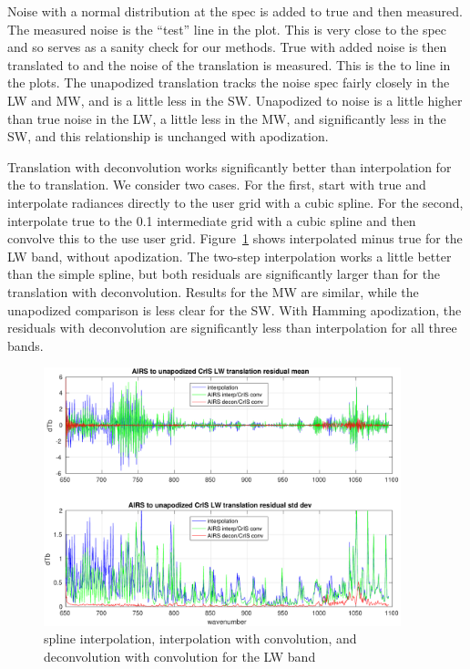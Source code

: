 \documentclass[11pt]{article}
\begin{document}
Noise with a normal distribution at the {\airs} spec is added to
true {\airs} and then measured.  The measured {\airs} noise is the
``test'' line in the plot.  This is very close to the spec and so
serves as a sanity check for our methods.  True {\airs} with added
noise is then translated to {\cris} and the noise of the translation
is measured.  This is the {\airs} to {\cris} line in the plots.  The
unapodized translation tracks the {\airs} noise spec fairly closely
in the LW and MW, and is a little less in the SW.  Unapodized
{\airs} to {\cris} noise is a little higher than true {\cris} noise
in the LW, a little less in the MW, and significantly less in the
SW, and this relationship is unchanged with apodization.

Translation with deconvolution works significantly better than
interpolation for the {\airs} to {\cris} translation.  We consider
two cases.  For the first, start with true {\airs} and interpolate
radiances directly to the {\cris} user grid with a cubic spline.
For the second, interpolate true {\airs} to the 0.1 {\wn}
intermediate grid with a cubic spline and then convolve this to the
use {\cris} user grid.  Figure~\ref{intpLW} shows interpolated
{\cris} minus true {\cris} for the LW band, without apodization.
The two-step interpolation works a little better than the simple
spline, but both residuals are significantly larger than for the
translation with deconvolution.  Results for the MW are similar,
while the unapodized comparison is less clear for the SW.  With
Hamming apodization, the residuals with deconvolution are
significantly less than interpolation for all three bands.

\begin{figure} %
  \centering
  \includegraphics[height=7.5cm]{figures/a2cris_interp_LW.pdf}
  \caption{spline interpolation, interpolation with convolution, 
    and deconvolution with convolution for the {\cris} LW band}
  \label{intpLW}
\end{figure}
\end{document}
